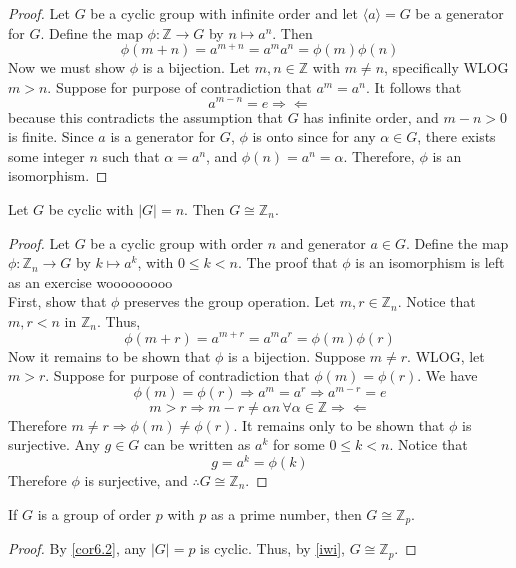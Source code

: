 \documentclass[12pt, letterpaper]{report}
\begin{document}
\begin{proof}
	Let \(G\) be a cyclic group with infinite order and let \(\langle a \rangle =G \) be a generator for \(G\). Define the map \(\phi :\mathbb{Z}\to G\) by \(n\mapsto a^n\). Then 
	\[
		\phi (m+n)=a^{m+n}=a^m a^n = \phi (m)\phi (n)
	\]
	Now we must show \(\phi \) is a bijection. Let \(m,n\in \mathbb{Z}\) with \(m\neq n\), specifically WLOG \(m>n\). Suppose for purpose of contradiction that \(a^m = a^n\). It follows that 
	\[
		a^{m-n}=e \Longrightarrow \Longleftarrow 
	\]
	because this contradicts the assumption that \(G\) has infinite order, and \(m-n>0\) is finite. Since \(a\) is a generator for \(G\), \(\phi \) is onto since for any \(\alpha \in G\), there exists some integer \(n\) such that \(\alpha =a^n\), and \(\phi (n)=a^n = \alpha \). Therefore, \(\phi \) is an isomorphism.
\end{proof}
\begin{theorem}\label{iwi}
	Let \(G\) be cyclic with \(\vert G \vert=n \). Then \(G\cong \mathbb{Z}_n\).
\end{theorem}
\begin{proof}
	Let \(G\) be a cyclic group with order \(n\) and generator \(a\in G\). Define the map \(\phi :\mathbb{Z}_n \to G\) by \(k\mapsto a^k\), with \(0\leq k<n\). The proof that \(\phi \) is an isomorphism is left as an exercise wooooooooo\\
	First, show that \(\phi \) preserves the group operation. Let \(m,r\in \mathbb{Z}_n\). Notice that \(m,r<n\) in \(\mathbb{Z}_n\). Thus,
	\[
		\phi (m+r)=a^{m+r}=a^m a^r = \phi (m)\phi (r)
	\]
	Now it remains to be shown that \(\phi \) is a bijection. Suppose \(m\neq r\). WLOG, let \(m>r\). Suppose for purpose of contradiction that \(\phi (m)=\phi (r)\). We have
	\[
		\phi (m) = \phi (r) \Longrightarrow a^m = a^r \Longrightarrow a^{m-r}=e
	\]
	\[
		m>r\Longrightarrow m-r\neq \alpha n\,\forall \alpha \in\mathbb{Z} \Longrightarrow \Longleftarrow
	\]
	Therefore \(m\neq r \Longrightarrow \phi (m)\neq \phi (r)\). It remains only to be shown that \(\phi \) is surjective. Any \(g\in G\) can be written as \(a^k\) for some \(0\leq k<n\). Notice that 
	\[
		g =a^k = \phi (k)
	\]
	Therefore \(\phi \) is surjective, and \(\therefore G\cong \mathbb{Z}_n\).
\end{proof}
\begin{corollary}
	If \(G\) is a group of order \(p\) with \(p\) as a prime number, then \(G\cong \mathbb{Z}_p\).
\end{corollary}
\begin{proof}
	By \ref{cor6.2}, any \(\vert G \vert =p \) is cyclic. Thus, by \ref{iwi}, \(G\cong \mathbb{Z}_p\).
\end{proof}
\end{document}

